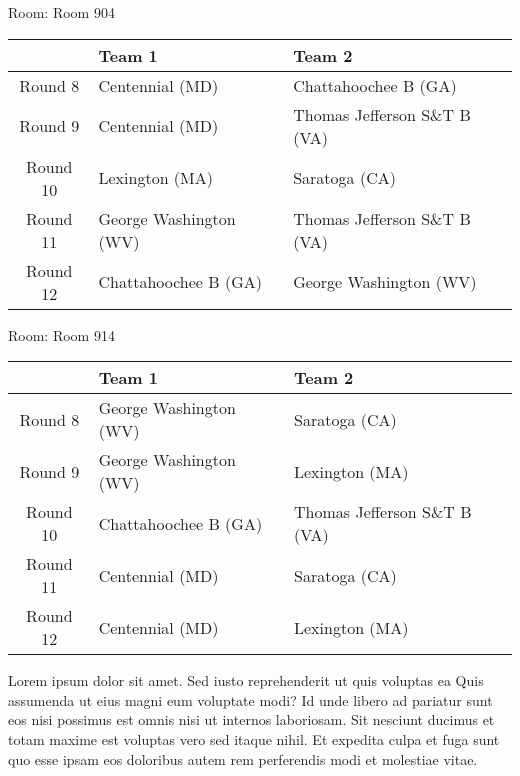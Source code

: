 \documentclass{article}%
\begin{document}
\vspace*{8pt}%
\linebreak%
\begin{flushleft}%
\begin{Large}%
Room: Room 904%
\end{Large}%
\end{flushleft}%
\begin{tabularx}{\textwidth}{|c|Y|Y|}%
\hline%
&Team 1&Team 2\\%
\hline%
Round 8&Centennial (MD)&Chattahoochee B (GA)\\%
Round 9&Centennial (MD)&Thomas Jefferson S\&T B (VA)\\%
Round 10&Lexington (MA)&Saratoga (CA)\\%
Round 11&George Washington (WV)&Thomas Jefferson S\&T B (VA)\\%
Round 12&Chattahoochee B (GA)&George Washington (WV)\\%
\hline%
\end{tabularx}%
\vspace*{8pt}%
\linebreak%
\begin{flushleft}%
\begin{Large}%
Room: Room 914%
\end{Large}%
\end{flushleft}%
\begin{tabularx}{\textwidth}{|c|Y|Y|}%
\hline%
&Team 1&Team 2\\%
\hline%
Round 8&George Washington (WV)&Saratoga (CA)\\%
Round 9&George Washington (WV)&Lexington (MA)\\%
Round 10&Chattahoochee B (GA)&Thomas Jefferson S\&T B (VA)\\%
Round 11&Centennial (MD)&Saratoga (CA)\\%
Round 12&Centennial (MD)&Lexington (MA)\\%
\hline%
\end{tabularx}%
\vspace*{8pt}%
\linebreak%
\newline%
Lorem ipsum dolor sit amet. Sed iusto reprehenderit ut quis voluptas ea Quis assumenda ut eius magni eum voluptate modi? Id unde libero ad pariatur sunt eos nisi possimus est omnis nisi ut internos laboriosam. Sit nesciunt ducimus et totam maxime est voluptas vero sed itaque nihil. Et expedita culpa et fuga sunt quo esse ipsam eos doloribus autem rem perferendis modi et molestiae vitae.\newline%
\end{document}

